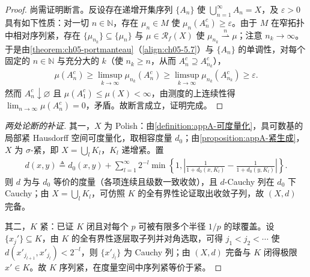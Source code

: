 \documentclass[../../main.tex]{subfiles}%
\begin{document}
\begin{proof}
尚需证明断言。反设存在递增开集序列 $\{A_n\}$ 使 $\bigcup_{n=1}^\infty A_n=X$，及 $\varepsilon>0$ 具有如下性质：对一切 $n\in\mathbb{N}$，存在 $\mu_n\in M$ 使 $\mu_n(A_n^c)\geqslant\varepsilon$。由于 $M$ 在窄拓扑中相对序列紧，存在 $\{\mu_{n_k}\}\subseteq\{\mu_n\}$ 与 $\mu\in\mathscr{R}_f(X)$ 使 $\mu_{n_k}\stackrel{n}{\rightharpoonup}\mu$；注意 $n_k\to\infty$。于是由\cref{theorem:ch05-portmanteau}（\eqref{align:ch05-5.7}）与 $\{A_n\}$ 的单调性，对每个固定的 $n\in\mathbb{N}$ 与充分大的 $k$（使 $n_k\geqslant n$，从而 $A_n^c\supseteq A_{n_k}^c$），
\begin{align*}
\mu(A_n^c)\geqslant\limsup_{k\to\infty}\mu_{n_k}(A_n^c)
\geqslant\limsup_{k\to\infty}\mu_{n_k}(A_{n_k}^c)\geqslant\varepsilon.
\end{align*}
然而 $A_n^c\downarrow\varnothing$ 且 $\mu(A_1^c)\leqslant\mu(X)<\infty$，由测度的上连续性得 $\lim_{n\to\infty}\mu(A_n^c)=0$，矛盾。故断言成立，证明完成。
\end{proof}

\begin{proof}[两处论断的补证]
其一，$X$ 为 Polish：由\cref{definition:appA-可度量化}，具可数基的局部紧 Hausdorff 空间可度量化，取相容度量 $d_0$；由\cref{proposition:appA-紧生成}，$X$ 为 $\sigma$-紧，即 $X=\bigcup_{l}K_l$，$K_l$ 递增紧。置
\begin{align*}
d(x,y)\triangleq d_0(x,y)+\sum_{l=1}^{\infty}2^{-l}\min\left\{1,\left|\frac{1}{1+d_0(x,K_l)}-\frac{1}{1+d_0(y,K_l)}\right|\right\}.
\end{align*}
则 $d$ 为与 $d_0$ 等价的度量（各项连续且级数一致收敛），且 $d$-Cauchy 列在 $d_0$ 下 Cauchy；由 $X=\bigcup_lK_l$，可仿照 $K$ 的全有界性论证取出收敛子列，故 $(X,d)$ 完备。

其二，$K$ 紧：已证 $K$ 闭且对每个 $p$ 可被有限多个半径 $1/p$ 的球覆盖。设 $\{x_j'\}\subseteq K$，由 $K$ 的全有界性逐层取子列并对角选取，可得 $j_1<j_2<\cdots$ 使 $d(x'_{j_{l+1}},x'_{j_l})<2^{-l}$，则 $\{x'_{j_l}\}$ 为 Cauchy 列；由 $(X,d)$ 完备与 $K$ 闭得极限 $x'\in K$。故 $K$ 序列紧，在度量空间中序列紧等价于紧。
\end{proof}
\end{document}
